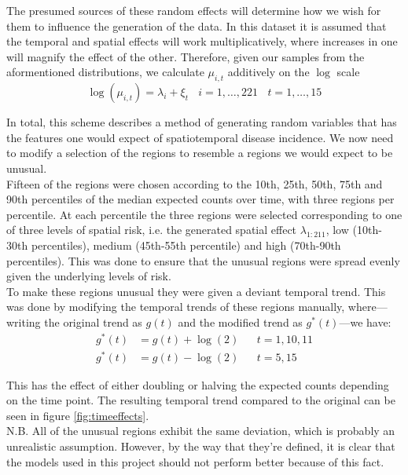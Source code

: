 \documentclass[11pt]{report}
\begin{document}
The presumed sources of these random effects will determine how we wish for them to influence the generation of the data. In this dataset it is assumed that the temporal and spatial effects will work multiplicatively, where increases in one will magnify the effect of the other. Therefore, given our samples from the aformentioned distributions, we calculate $\mu_{i,t}$ additively on the $\log$ scale
\begin{equation}
\log{(\mu_{i,t})} = \lambda_i + \xi_t \ \ \ \ i=1,\ldots,221 \ \ \ \ t=1,\ldots,15
\end{equation}

In total, this scheme describes a method of generating random variables that has the features one would expect of spatiotemporal disease incidence. We now need to modify a selection of the regions to resemble a regions we would expect to be unusual. \\

Fifteen of the regions were chosen according to the 10th, 25th, 50th, 75th and 90th percentiles of the median expected counts over time, with three regions per percentile. At each percentile the three regions were selected corresponding to one of three levels of spatial risk, i.e. the generated spatial effect $\lambda_{1:211}$, low (10th-30th percentiles), medium (45th-55th percentile) and high (70th-90th percentiles). This was done to ensure that the unusual regions were spread evenly given the underlying levels of risk. \\

To make these regions unusual they were given a deviant temporal trend. This was done by modifying the temporal trends of these regions manually, where---writing the original trend as $g(t)$ and the modified trend as $g^*(t)$---we have:
\begin{align}
g^*(t) &= g(t) + \log(2) && t = 1, 10, 11 \\ 
g^*(t) &= g(t) - \log(2) && t = 5, 15
\end{align}

This has the effect of either doubling or halving the expected counts depending on the time point. The resulting temporal trend compared to the original can be seen in figure \ref{fig:timeeffects}. \\

 N.B. All of the unusual regions exhibit the same deviation, which is probably an unrealistic assumption. However, by the way that they're defined, it is clear that the models used in this project should not perform better because of this fact. 
\end{document}
